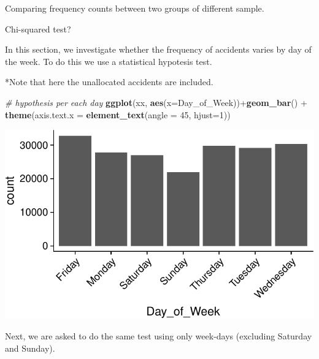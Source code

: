 \documentclass[]{article}
\newenvironment{Shaded}{\begin{snugshade}}{\end{snugshade}}
\newcommand{\KeywordTok}[1]{\textcolor[rgb]{0.13,0.29,0.53}{\textbf{{#1}}}}
\newcommand{\DataTypeTok}[1]{\textcolor[rgb]{0.13,0.29,0.53}{{#1}}}
\newcommand{\DecValTok}[1]{\textcolor[rgb]{0.00,0.00,0.81}{{#1}}}
\newcommand{\StringTok}[1]{\textcolor[rgb]{0.31,0.60,0.02}{{#1}}}
\newcommand{\CommentTok}[1]{\textcolor[rgb]{0.56,0.35,0.01}{\textit{{#1}}}}
\newcommand{\NormalTok}[1]{{#1}}
\begin{document}
Comparing frequency counts between two groups of different sample.

Chi-squared test?

In this section, we investigate whether the frequency of accidents
varies by day of the week. To do this we use a statistical hypotesis
test.

*Note that here the unallocated accidents are included.

\begin{Shaded}
\begin{Highlighting}[]
\CommentTok{# hypothesis per each day}
\KeywordTok{ggplot}\NormalTok{(xx, }\KeywordTok{aes}\NormalTok{(}\DataTypeTok{x=}\NormalTok{Day_of_Week))+}\KeywordTok{geom_bar}\NormalTok{() +}
\StringTok{  }\KeywordTok{theme}\NormalTok{(}\DataTypeTok{axis.text.x =} \KeywordTok{element_text}\NormalTok{(}\DataTypeTok{angle =} \DecValTok{45}\NormalTok{, }\DataTypeTok{hjust=}\DecValTok{1}\NormalTok{))}
\end{Highlighting}
\end{Shaded}

\includegraphics{README_files/figure-latex/unnamed-chunk-10-1.pdf}

Next, we are asked to do the same test using only week-days (excluding
Saturday and Sunday).

\begin{Shaded}
\end{Shaded}
\end{document}
